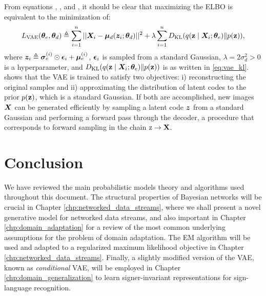 From equations , , and , it should be clear that maximizing the ELBO is equivalent to the minimization of:
\begin{equation}
    \label{eq:vae_loss}
    L_{\text{VAE}}({\bm{\theta}}_e, {\bm{\theta}}_d) \triangleq \sum_{i=1}^n ||{\bm{X}}_i - {\bm{\mu}}_d({\bm{z}}_i; {\bm{\theta}}_d)||^2 + \lambda \sum_{i=1}^n D_{\mathrm{KL}}(q({\mathbf{z}} \mid {\bm{X}}_i; {\bm{\theta}}_e) \Vert p({\mathbf{z}})),
\end{equation}
where ${\bm{z}}_i \triangleq {\bm{\sigma}}_e^{(i)} \odot {\bm{\epsilon}}_i + {\bm{\mu}}_e^{(i)}$, ${\bm{\epsilon}}_i$ is sampled from a standard Gaussian, $\lambda = 2\sigma_d^2 > 0$ is a hyperparameter, and $D_{\mathrm{KL}}(q({\mathbf{z}} \mid {\bm{X}}_i; {\bm{\theta}}_e) \Vert p({\mathbf{z}}))$ is as written in \eqref{eq:vae_kl}.  shows that the VAE is trained to satisfy two objectives: i) reconstructing the original samples and ii) approximating the distribution of latent codes to the prior $p({\mathbf{z}})$, which is a standard Gaussian. If both are accomplished, new images ${\bm{X}}$ can be generated efficiently by sampling a latent code ${\bm{z}}$ from a standard Gaussian and performing a forward pass through the decoder, a procedure that corresponds to forward sampling in the chain ${\textnormal{z}} \rightarrow {\mathbf{X}}$.

\section{Conclusion}
\label{sec:background_conclusion}
We have reviewed the main probabilistic models theory and algorithms used throughout this document. The structural properties of Bayesian networks will be crucial in Chapter \ref{chp:networked_data_streams}, where we shall present a novel generative model for networked data streams, and also important in Chapter \ref{chp:domain_adaptation} for a review of the most common underlying assumptions for the problem of domain adaptation. The EM algorithm will be used and adapted to a regularized maximum likelihood objective in Chapter \ref{chp:networked_data_streams}. Finally, a slightly modified version of the VAE, known as \emph{conditional} VAE, will be employed in Chapter \ref{chp:domain_generalization} to learn signer-invariant representations for sign-language recognition.